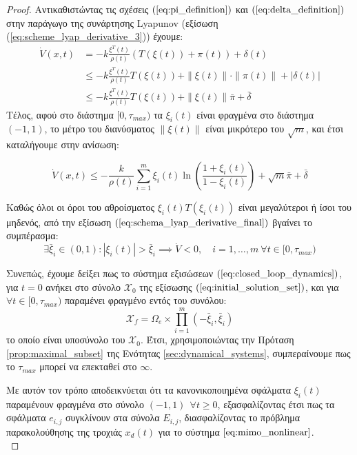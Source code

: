 \begin{proof}
Αντικαθιστώντας τις σχέσεις $(\ref{eq:pi_definition})$ και $(\ref{eq:delta_definition})$ στην παράγωγο της συνάρτησης Lyapunov (εξίσωση  (\ref{eq:scheme_lyap_derivative_3})) έχουμε:
\begin{equation}
\begin{split}
	\dot{V}(x,t) &= 
	-k \frac{\xi^T(t)} {\rho(t)} \left( T(\xi(t)) + \pi(t) \right)  
	+ \delta(t) \\
	&\leq -k \frac{\xi^T(t)} {\rho(t)} T(\xi(t)) 
	+ \| \xi(t) \| \cdot \| \pi(t) \| + | \delta(t) |\\
	&\leq  -k \frac{\xi^T(t)} {\rho(t)} T(\xi(t)) 
	+ \| \xi(t) \| \bar{\pi} + \bar{\delta}
	\end{split}
\end{equation}
Τέλος, αφού στο διάστημα $[0, \tau_{max} )$ τα $\xi_i(t)$ είναι φραγμένα στο διάστημα $(-1,1)$, το μέτρο του διανύσματος $\| \xi(t) \|$ είναι μικρότερο του $\sqrt{m}$, και έτσι καταλήγουμε στην ανίσωση:

\begin{equation*}
	\dot{V}(x,t) \leq  - \frac{k} {\rho(t)} 
	\sum_{i=1}^{m} \xi_i(t) \ln \left( \frac{1 + \xi_i(t)}{1 - \xi_i(t)} \right) 
	+ \sqrt{m} \bar{\pi} + \bar{\delta}
	\label{eq:schema_lyap_derivative_final}
\end{equation*}

Καθώς όλοι οι όροι του αθροίσματος $\xi_i(t) T(\xi_i(t)) $ είναι μεγαλύτεροι ή ίσοι του μηδενός, από την εξίσωση $(\ref{eq:schema_lyap_derivative_final})$ βγαίνει το συμπέρασμα:
\begin{equation*}
	\exists \bar{\xi}_{i} \in (0,1) : | \xi_i(t) | > \bar{\xi}_{i}
	\implies \dot{V} < 0, \quad i = 1,\dots,m  
	\: \forall t \in [0, \tau_{max})
\end{equation*}

Συνεπώς, έχουμε δείξει πως το σύστημα εξισώσεων $(\ref{eq:closed_loop_dynamics})$, για $t = 0$ ανήκει στο σύνολο $\mathcal{X}_0$ της εξίσωσης  $(\ref{eq:initial_solution_set})$, και για $\forall t \in [0, \tau_{max} )$ παραμένει φραγμένο εντός του συνόλου:
\begin{equation*}
\mathcal{X}_f = \Omega_e \times 
\prod_{i = 1}^{m} (-\bar{\xi}_i,\bar{\xi}_i) 
\end{equation*}
το οποίο είναι υποσύνολο του $\mathcal{X}_0$. Έτσι, χρησιμοποιώντας την Πρόταση \ref{prop:maximal_subset} της Ενότητας \ref{sec:dynamical_systems}, συμπεραίνουμε πως το $\tau_{max}$ μπορεί να επεκταθεί στο $\infty$.

Με αυτόν τον τρόπο αποδεικνύεται ότι τα κανονικοποιημένα σφάλματα $\xi_i(t)$ παραμένουν φραγμένα στο σύνολο $(-1,1) \: \: \forall t \geq 0$, εξασφαλίζοντας έτσι πως τα σφάλματα $e_{i,j}$ συγκλίνουν στα σύνολα $E_{i,j}$, διασφαλίζοντας το πρόβλημα παρακολούθησης της τροχιάς $x_d(t)$ για το σύστημα $\ref{eq:mimo_nonlinear}$.\\
\end{proof}



